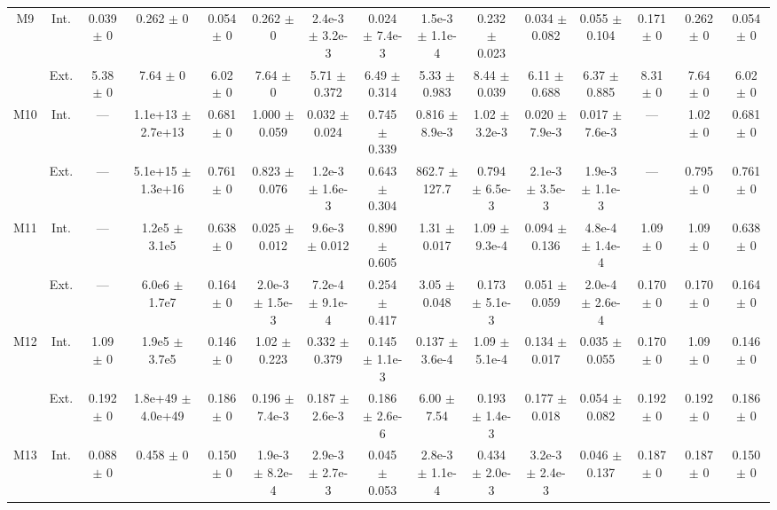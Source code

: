\begin{table}[htbp]
{\begin{tabular}{@{}ccccccccccccccc@{}}
\cline{2-15}
\multirow{2}{*}{M9} & Int. & 0.039 $\pm$ 0 & 0.262 $\pm$ 0 & 0.054 $\pm$ 0 & 0.262 $\pm$ 0 & 2.4e-3 $\pm$ 3.2e-3 & 0.024 $\pm$ 7.4e-3 & 1.5e-3 $\pm$ 1.1e-4 & 0.232 $\pm$ 0.023 & 0.034 $\pm$ 0.082 & 0.055 $\pm$ 0.104 & 0.171 $\pm$ 0 & 0.262 $\pm$ 0 & 0.054 $\pm$ 0 \\
 & Ext. & 5.38 $\pm$ 0 & 7.64 $\pm$ 0 & 6.02 $\pm$ 0 & 7.64 $\pm$ 0 & 5.71 $\pm$ 0.372 & 6.49 $\pm$ 0.314 & 5.33 $\pm$ 0.983 & 8.44 $\pm$ 0.039 & 6.11 $\pm$ 0.688 & 6.37 $\pm$ 0.885 & 8.31 $\pm$ 0 & 7.64 $\pm$ 0 & 6.02 $\pm$ 0 \\
\cline{2-15}
\multirow{2}{*}{M10} & Int. & --- & 1.1e+13 $\pm$ 2.7e+13 & 0.681 $\pm$ 0 & 1.000 $\pm$ 0.059 & 0.032 $\pm$ 0.024 & 0.745 $\pm$ 0.339 & 0.816 $\pm$ 8.9e-3 & 1.02 $\pm$ 3.2e-3 & 0.020 $\pm$ 7.9e-3 & 0.017 $\pm$ 7.6e-3 & --- & 1.02 $\pm$ 0 & 0.681 $\pm$ 0 \\
 & Ext. & --- & 5.1e+15 $\pm$ 1.3e+16 & 0.761 $\pm$ 0 & 0.823 $\pm$ 0.076 & 1.2e-3 $\pm$ 1.6e-3 & 0.643 $\pm$ 0.304 & 862.7 $\pm$ 127.7 & 0.794 $\pm$ 6.5e-3 & 2.1e-3 $\pm$ 3.5e-3 & 1.9e-3 $\pm$ 1.1e-3 & --- & 0.795 $\pm$ 0 & 0.761 $\pm$ 0 \\
\cline{2-15}
\multirow{2}{*}{M11} & Int. & --- & 1.2e5 $\pm$ 3.1e5 & 0.638 $\pm$ 0 & 0.025 $\pm$ 0.012 & 9.6e-3 $\pm$ 0.012 & 0.890 $\pm$ 0.605 & 1.31 $\pm$ 0.017 & 1.09 $\pm$ 9.3e-4 & 0.094 $\pm$ 0.136 & 4.8e-4 $\pm$ 1.4e-4 & 1.09 $\pm$ 0 & 1.09 $\pm$ 0 & 0.638 $\pm$ 0 \\
 & Ext. & --- & 6.0e6 $\pm$ 1.7e7 & 0.164 $\pm$ 0 & 2.0e-3 $\pm$ 1.5e-3 & 7.2e-4 $\pm$ 9.1e-4 & 0.254 $\pm$ 0.417 & 3.05 $\pm$ 0.048 & 0.173 $\pm$ 5.1e-3 & 0.051 $\pm$ 0.059 & 2.0e-4 $\pm$ 2.6e-4 & 0.170 $\pm$ 0 & 0.170 $\pm$ 0 & 0.164 $\pm$ 0 \\
\cline{2-15}
\multirow{2}{*}{M12} & Int. & 1.09 $\pm$ 0 & 1.9e5 $\pm$ 3.7e5 & 0.146 $\pm$ 0 & 1.02 $\pm$ 0.223 & 0.332 $\pm$ 0.379 & 0.145 $\pm$ 1.1e-3 & 0.137 $\pm$ 3.6e-4 & 1.09 $\pm$ 5.1e-4 & 0.134 $\pm$ 0.017 & 0.035 $\pm$ 0.055 & 0.170 $\pm$ 0 & 1.09 $\pm$ 0 & 0.146 $\pm$ 0 \\
 & Ext. & 0.192 $\pm$ 0 & 1.8e+49 $\pm$ 4.0e+49 & 0.186 $\pm$ 0 & 0.196 $\pm$ 7.4e-3 & 0.187 $\pm$ 2.6e-3 & 0.186 $\pm$ 2.6e-6 & 6.00 $\pm$ 7.54 & 0.193 $\pm$ 1.4e-3 & 0.177 $\pm$ 0.018 & 0.054 $\pm$ 0.082 & 0.192 $\pm$ 0 & 0.192 $\pm$ 0 & 0.186 $\pm$ 0 \\
\cline{2-15}
\multirow{2}{*}{M13} & Int. & 0.088 $\pm$ 0 & 0.458 $\pm$ 0 & 0.150 $\pm$ 0 & 1.9e-3 $\pm$ 8.2e-4 & 2.9e-3 $\pm$ 2.7e-3 & 0.045 $\pm$ 0.053 & 2.8e-3 $\pm$ 1.1e-4 & 0.434 $\pm$ 2.0e-3 & 3.2e-3 $\pm$ 2.4e-3 & 0.046 $\pm$ 0.137 & 0.187 $\pm$ 0 & 0.187 $\pm$ 0 & 0.150 $\pm$ 0 \\

\end{tabular}}
\end{table}
